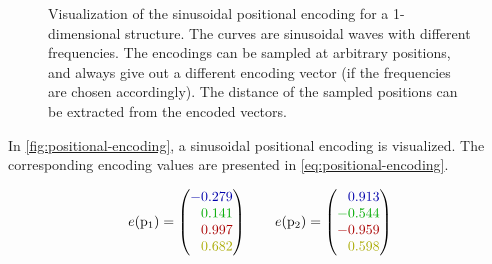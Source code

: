\begin{figure}[htbp]
    \centering
    \vspace{0.1cm}
    \caption{Visualization of the sinusoidal positional encoding for a 1-dimensional structure.
            The curves are sinusoidal waves with different frequencies. 
            The encodings can be sampled at arbitrary positions, and always give out a different encoding vector (if the frequencies are chosen accordingly).
            The distance of the sampled positions can be extracted from the encoded vectors.
    }
    \label{fig:positional-encoding}
\end{figure}

In \autoref{fig:positional-encoding}, a sinusoidal positional encoding is visualized. 
The corresponding encoding values are presented in \autoref{eq:positional-encoding}.

\begin{equation}
    \label{eq:positional-encoding}
    e(\mathrm{p}_1) = \left(\begin{matrix}
        \textcolor{textblue}{-0.279}\\
        \textcolor{textgreen}{\phantom{-}0.141}\\
        \textcolor{textred}{\phantom{-}0.997}\\
        \textcolor{textyellow}{\phantom{-}0.682}\\
    \end{matrix}\right)\qquad
    e(\mathrm{p}_2) = \left(\begin{matrix}
        \textcolor{textblue}{\phantom{-}0.913}\\
        \textcolor{textgreen}{-0.544}\\
        \textcolor{textred}{-0.959}\\
        \textcolor{textyellow}{\phantom{-}0.598}\\
    \end{matrix}\right)
\end{equation}
